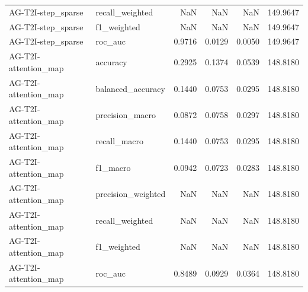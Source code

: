 \begin{tabular}{llrrrr}
AG-T2I-step_sparse & recall_weighted & NaN & NaN & NaN & 149.9647 \\
AG-T2I-step_sparse & f1_weighted & NaN & NaN & NaN & 149.9647 \\
AG-T2I-step_sparse & roc_auc & 0.9716 & 0.0129 & 0.0050 & 149.9647 \\
AG-T2I-attention_map & accuracy & 0.2925 & 0.1374 & 0.0539 & 148.8180 \\
AG-T2I-attention_map & balanced_accuracy & 0.1440 & 0.0753 & 0.0295 & 148.8180 \\
AG-T2I-attention_map & precision_macro & 0.0872 & 0.0758 & 0.0297 & 148.8180 \\
AG-T2I-attention_map & recall_macro & 0.1440 & 0.0753 & 0.0295 & 148.8180 \\
AG-T2I-attention_map & f1_macro & 0.0942 & 0.0723 & 0.0283 & 148.8180 \\
AG-T2I-attention_map & precision_weighted & NaN & NaN & NaN & 148.8180 \\
AG-T2I-attention_map & recall_weighted & NaN & NaN & NaN & 148.8180 \\
AG-T2I-attention_map & f1_weighted & NaN & NaN & NaN & 148.8180 \\
AG-T2I-attention_map & roc_auc & 0.8489 & 0.0929 & 0.0364 & 148.8180 \\
\bottomrule
\end{tabular}
